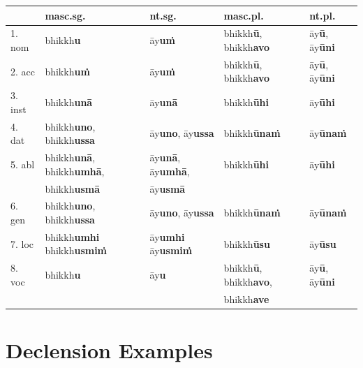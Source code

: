 \documentclass[11pt,oneside]{memoir}
\begin{document}
\begin{center}
\begin{tabular}{lllll}
 & \textbf{masc.sg.} & \textbf{nt.sg.} & \textbf{masc.pl.} & \textbf{nt.pl.}\\
\hline
1. nom & bhikkh\textbf{u} & āy\textbf{uṁ} & bhikkh\textbf{ū}, bhikkh\textbf{avo} & āy\textbf{ū}, āy\textbf{ūni}\\
2. acc & bhikkh\textbf{uṁ} & āy\textbf{uṁ} & bhikkh\textbf{ū}, bhikkh\textbf{avo} & āy\textbf{ū}, āy\textbf{ūni}\\
3. inst & bhikkh\textbf{unā} & āy\textbf{unā} & bhikkh\textbf{ūhi} & āy\textbf{ūhi}\\
4. dat & bhikkh\textbf{uno}, bhikkh\textbf{ussa} & āy\textbf{uno}, āy\textbf{ussa} & bhikkh\textbf{ūnaṁ} & āy\textbf{ūnaṁ}\\
5. abl & bhikkh\textbf{unā}, bhikkh\textbf{umhā}, & āy\textbf{unā}, āy\textbf{umhā}, & bhikkh\textbf{ūhi} & āy\textbf{ūhi}\\
 & bhikkh\textbf{usmā} & āy\textbf{usmā} &  & \\
6. gen & bhikkh\textbf{uno}, bhikkh\textbf{ussa} & āy\textbf{uno}, āy\textbf{ussa} & bhikkh\textbf{ūnaṁ} & āy\textbf{ūnaṁ}\\
7. loc & bhikkh\textbf{umhi} bhikkh\textbf{usmiṁ} & āy\textbf{umhi} āy\textbf{usmiṁ} & bhikkh\textbf{ūsu} & āy\textbf{ūsu}\\
8. voc & bhikkh\textbf{u} & āy\textbf{u} & bhikkh\textbf{ū}, bhikkh\textbf{avo}, & āy\textbf{ū}, āy\textbf{ūni}\\
 &  &  & bhikkh\textbf{ave} & \\
\end{tabular}
\end{center}

\clearpage
\section{Declension Examples}
\label{sec:orge6517f2}
\end{document}
